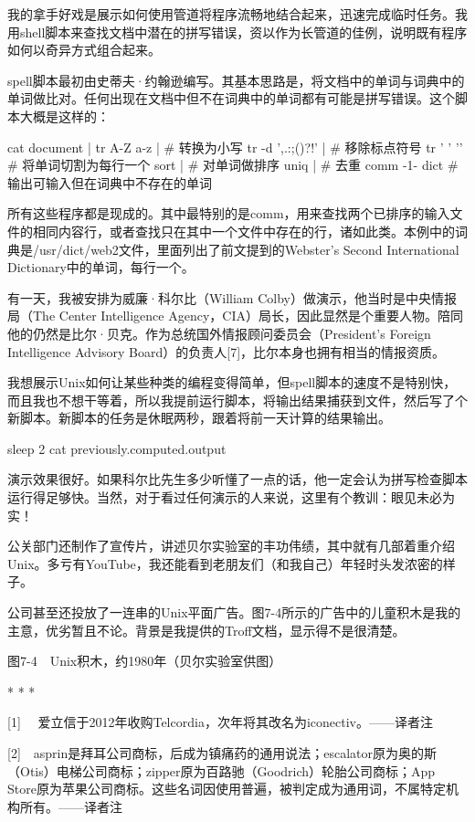 \documentclass[a4paper,12pt,UTF8,twoside]{ctexbook}
\begin{document}
{{我的拿手好戏是展示如何使用管道将程序流畅地结合起来，迅速完成临时任务。我用shell脚本来查找文档中潜在的拼写错误，资以作为长管道的佳例，说明既有程序如何以奇异方式组合起来。

spell脚本最初由史蒂夫·约翰逊编写。其基本思路是，将文档中的单词与词典中的单词做比对。任何出现在文档中但不在词典中的单词都有可能是拼写错误。这个脚本大概是这样的：

cat document | tr A-Z a-z | # 转换为小写 tr -d ',.:;()?!' | # 移除标点符号 tr ' ' '\n' # 将单词切割为每行一个 sort | # 对单词做排序 uniq | # 去重 comm -1- dict # 输出可输入但在词典中不存在的单词

所有这些程序都是现成的。其中最特别的是comm，用来查找两个已排序的输入文件的相同内容行，或者查找只在其中一个文件中存在的行，诸如此类。本例中的词典是/usr/dict/web2文件，里面列出了前文提到的Webster’s Second International Dictionary中的单词，每行一个。

有一天，我被安排为威廉·科尔比（William Colby）做演示，他当时是中央情报局（The Center Intelligence Agency，CIA）局长，因此显然是个重要人物。陪同他的仍然是比尔·贝克。作为总统国外情报顾问委员会（President’s Foreign Intelligence Advisory Board）的负责人[7]，比尔本身也拥有相当的情报资质。

我想展示Unix如何让某些种类的编程变得简单，但spell脚本的速度不是特别快，而且我也不想干等着，所以我提前运行脚本，将输出结果捕获到文件，然后写了个新脚本。新脚本的任务是休眠两秒，跟着将前一天计算的结果输出。

sleep 2 cat previously.computed.output

演示效果很好。如果科尔比先生多少听懂了一点的话，他一定会认为拼写检查脚本运行得足够快。当然，对于看过任何演示的人来说，这里有个教训：眼见未必为实！

公关部门还制作了宣传片，讲述贝尔实验室的丰功伟绩，其中就有几部着重介绍Unix。多亏有YouTube，我还能看到老朋友们（和我自己）年轻时头发浓密的样子。

公司甚至还投放了一连串的Unix平面广告。图7-4所示的广告中的儿童积木是我的主意，优劣暂且不论。背景是我提供的Troff文档，显示得不是很清楚。



图7-4　Unix积木，约1980年（贝尔实验室供图）



* * *



[1]　 爱立信于2012年收购Telcordia，次年将其改名为iconectiv。——译者注

[2]　asprin是拜耳公司商标，后成为镇痛药的通用说法；escalator原为奥的斯（Otis）电梯公司商标；zipper原为百路驰（Goodrich）轮胎公司商标；App Store原为苹果公司商标。这些名词因使用普遍，被判定成为通用词，不属特定机构所有。——译者注

}}
\end{document}
